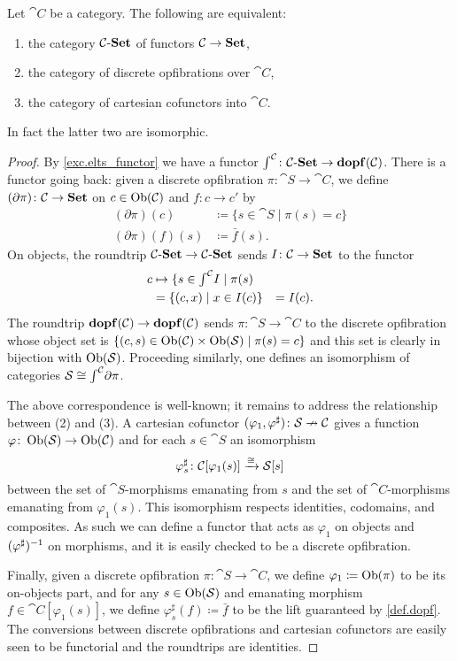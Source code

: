 \documentclass[Book-Poly]{subfiles}
\begin{document}
\begin{proposition}\label{prop.tfae_dopf}
Let $\cat{C}$ be a category. The following are equivalent:
\begin{enumerate}
	\item the category $\mathcal{C}\textnormal{-}\mathbf{Set}$ of functors $\mathcal{C}\to\mathbf{Set}$,
	\item the category of discrete opfibrations over $\cat{C}$,
	\item the category of cartesian cofunctors into $\cat{C}$.
\end{enumerate}
In fact the latter two are isomorphic.
\end{proposition}
\begin{proof}
By \cref{exc.elts_functor} we have a functor $\textstyle{\int}^{\mathcal{C}}\colon\mathcal{C}\textnormal{-}\mathbf{Set}\to\mathbf{dopf}(\mathcal{C})$. There is a functor going back: given a discrete opfibration $\pi\colon\cat{S}\to\cat{C}$, we define $(\partial\pi)\colon\mathcal{C}\to\mathbf{Set}$ on $c\in\operatorname{Ob}(\mathcal{C})$ and $f\colon c\to c'$ by 
\begin{align*}
	(\partial\pi)(c)&\coloneqq\{s\in\cat{S}\mid\pi(s)=c\}\\
	(\partial\pi)(f)(s)&\coloneqq\bar{f}(s).
\end{align*}
On objects, the roundtrip $\mathcal{C}\textnormal{-}\mathbf{Set}\to\mathcal{C}\textnormal{-}\mathbf{Set}$ sends $I\colon\mathcal{C}\to\mathbf{Set}$ to the functor
\begin{align*}
	c&
	\mapsto\{s\in\textstyle{\int}^{\mathcal{C}}I\mid \pi(s)\\&
	=\{(c,x)\mid x\in I(c)\}&=I(c).
\end{align*}
The roundtrip $\mathbf{dopf}(\mathcal{C})\to\mathbf{dopf}(\mathcal{C})$ sends $\pi\colon\cat{S}\to\cat{C}$ to the discrete opfibration whose object set is $\{(c,s)\in\operatorname{Ob}(\mathcal{C})\times\operatorname{Ob}(\mathcal{S})\mid\pi(s)=c\}$ and this set is clearly in bijection with $\operatorname{Ob}(\mathcal{S})$. Proceeding similarly, one defines an isomorphism of categories $\mathcal{S}\cong\textstyle{\int}^{\mathcal{C}}\partial\pi$.

The above correspondence is well-known; it remains to address the relationship between (2) and (3). A cartesian cofunctor $(\varphi_1,\varphi^\sharp)\colon\mathcal{S}\nrightarrow\mathcal{C}$ gives a function $\varphi\colon\operatorname{Ob}(\mathcal{S})\to\operatorname{Ob}(\mathcal{C})$ and for each $s\in\cat{S}$ an isomorphism
\[
  \varphi_s^\sharp\colon\mathcal{C}[\varphi_1(s)]\xrightarrow{\cong}\mathcal{S}[s]
\]
between the set of $\cat{S}$-morphisms emanating from $s$ and the set of $\cat{C}$-morphisms emanating from $\varphi_1(s)$. This isomorphism respects identities, codomains, and composites. As such we can define a functor that acts as $\varphi_1$ on objects and $(\varphi^\sharp)^{-1}$ on morphisms, and it is easily checked to be a discrete opfibration.

Finally, given a discrete opfibration $\pi\colon\cat{S}\to\cat{C}$, we define $\varphi_1\coloneqq\operatorname{Ob}(\pi)$ to be its on-objects part, and for any $s\in\operatorname{Ob}(\mathcal{S})$ and emanating morphism $f\in\cat{C}[\varphi_1(s)]$, we define $\varphi^\sharp_s(f)\coloneqq\bar{f}$ to be the lift guaranteed by \cref{def.dopf}. The conversions between discrete opfibrations and cartesian cofunctors are easily seen to be functorial and the roundtrips are identities.
\end{proof}
\end{document}
